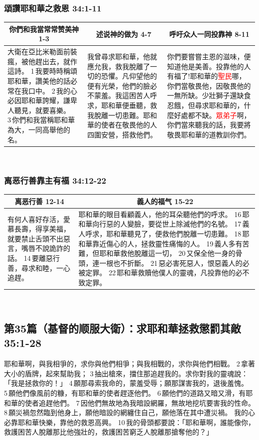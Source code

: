 \subsubsection{頌讚耶和華之救恩 34:1-11}
\begin{table}[H]
\centering
\begin{tabular}{p{5.25cm}|p{5.25cm}|p{6.5cm}}\hline\hline
\multicolumn{1}{c|}{你們和我當常常赞美神 1-3}&\multicolumn{1}{c|}{述说神的做为 4-7}&\multicolumn{1}{c}{呼吁众人一同投靠神 8-11}\\\hline
大衛在亞比米勒面前裝瘋，被他趕出去，就作這詩。
1 我要時時稱頌耶和華，讚美他的話必常在我口中。
2 我的心必因耶和華誇耀，謙卑人聽見，就要喜樂。
3 你們和我當稱耶和華為大，一同高舉他的名。
&我曾尋求耶和華，他就應允我，救我脫離了一切的恐懼。凡仰望他的便有光榮，他們的臉必不蒙羞。我這困苦人呼求，耶和華便垂聽，救我脫離一切患難。耶和華的使者在敬畏他的人四圍安營，搭救他們。
&你們要嘗嘗主恩的滋味，便知道他是美善。投靠他的人有福了!耶和華的\textcolor{red}{聖民}哪，你們當敬畏他，因敬畏他的一無所缺。少壯獅子還缺食忍餓，但尋求耶和華的，什麼好處都不缺。\textcolor{red}{眾弟子}啊，你們當來聽我的話，我要將敬畏耶和華的道教訓你們。\\\hline
\end{tabular}
\end{table} 


\subsubsection{离恶行善靠主有福 34:12-22}
\begin{table}[H]
\centering
\begin{tabular}{p{3.75cm}|p{13.25cm}}\hline\hline
\multicolumn{1}{c|}{离恶行善 12-14}&\multicolumn{1}{c}{義人的福气 15-22}\\\hline
有何人喜好存活，愛慕長壽，得享美福，就要禁止舌頭不出惡言，嘴唇不說詭詐的話。
14 要離惡行善，尋求和睦，一心追趕。
&耶和華的眼目看顧義人，他的耳朵聽他們的呼求。
16 耶和華向行惡的人變臉，要從世上除滅他們的名號。
17 義人呼求，耶和華聽見了，便救他們脫離一切患難。
18 耶和華靠近傷心的人，拯救靈性痛悔的人。
19 義人多有苦難，但耶和華救他脫離這一切，
20 又保全他一身的骨頭，連一根也不折斷。
21 惡必害死惡人，恨惡義人的必被定罪。
22 耶和華救贖他僕人的靈魂，凡投靠他的必不致定罪。\\\hline
\end{tabular}
\end{table} 


\subsection{第35篇（基督的顺服大衛）：求耶和華拯救懲罰其敵 35:1-28}
耶和華啊，與我相爭的，求你與他們相爭；與我相戰的，求你與他們相戰。
2 拿著大小的盾牌，起來幫助我；
3 抽出槍來，擋住那追趕我的。求你對我的靈魂說：「我是拯救你的！」
4 願那尋索我命的，蒙羞受辱；願那謀害我的，退後羞愧。
5 願他們像風前的糠，有耶和華的使者趕逐他們。
6 願他們的道路又暗又滑，有耶和華的使者追趕他們。
7 因他們無故地為我暗設網羅，無故地挖坑要害我的性命。
8 願災禍忽然臨到他身上，願他暗設的網纏住自己，願他落在其中遭災禍。
我的心必靠耶和華快樂，靠他的救恩高興。
10 我的骨頭都要說：「耶和華啊，誰能像你，救護困苦人脫離那比他強壯的，救護困苦窮乏人脫離那搶奪他的？」

